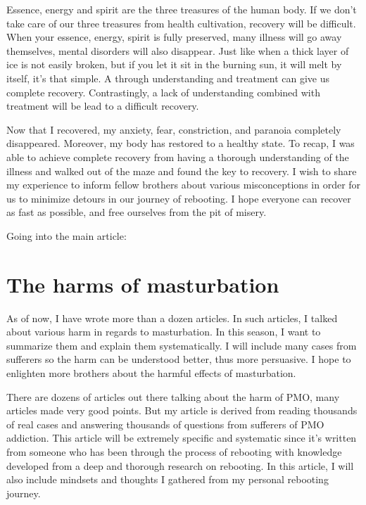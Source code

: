 \documentclass[
]{book}
\begin{document}
Essence, energy and spirit are the three treasures of the human body. If we don't take care of our three treasures from health cultivation, recovery will be difficult. When your essence, energy, spirit is fully preserved, many illness will go away themselves, mental disorders will also disappear. Just like when a thick layer of ice is not easily broken, but if you let it sit in the burning sun, it will melt by itself, it's that simple. A through understanding and treatment can give us complete recovery. Contrastingly, a lack of understanding combined with treatment will be lead to a difficult recovery.

Now that I recovered, my anxiety, fear, constriction, and paranoia completely disappeared. Moreover, my body has restored to a healthy state. To recap, I was able to achieve complete recovery from having a thorough understanding of the illness and walked out of the maze and found the key to recovery. I wish to share my experience to inform fellow brothers about various misconceptions in order for us to minimize detours in our journey of rebooting. I hope everyone can recover as fast as possible, and free ourselves from the pit of misery.

Going into the main article:

\hypertarget{the-harms-of-masturbation}{%
\section{The harms of masturbation}\label{the-harms-of-masturbation}}

As of now, I have wrote more than a dozen articles. In such articles, I talked about various harm in regards to masturbation. In this season, I want to summarize them and explain them systematically. I will include many cases from sufferers so the harm can be understood better, thus more persuasive. I hope to enlighten more brothers about the harmful effects of masturbation.

There are dozens of articles out there talking about the harm of PMO, many articles made very good points. But my article is derived from reading thousands of real cases and answering thousands of questions from sufferers of PMO addiction. This article will be extremely specific and systematic since it's written from someone who has been through the process of rebooting with knowledge developed from a deep and thorough research on rebooting. In this article, I will also include mindsets and thoughts I gathered from my personal rebooting journey.
\end{document}
